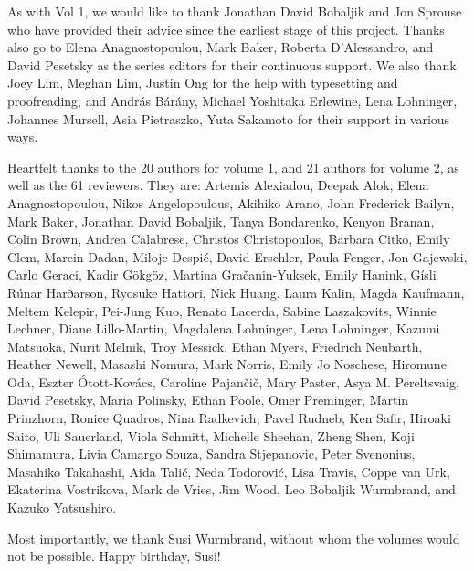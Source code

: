 \begin{refsection}


As with Vol 1, we would like to thank Jonathan David Bobaljik and Jon Sprouse who have provided their advice since the earliest stage of this project. 
Thanks also go to Elena Anagnostopoulou, Mark Baker, Roberta D'Alessandro, and David Pesetsky as the series editors for their continuous support. 
We also thank Joey Lim, Meghan Lim, Justin Ong for the help with typesetting and proofreading, and András Bárány, Michael Yoshitaka Erlewine, Lena Lohninger, Johannes Mursell, Asia Pietraszko, Yuta Sakamoto for their support in various ways.

Heartfelt thanks to the 20 authors for volume 1, and 21 authors for volume 2, as well as the 61 reviewers. They are: 
Artemis Alexiadou, 
Deepak Alok, 
Elena Anagnostopoulou, 
Nikos Angelopoulous, 
Akihiko Arano, 
John Frederick Bailyn, 
Mark Baker, 
Jonathan David Bobaljik, 
Tanya Bondarenko, 
Kenyon Branan, 
Colin Brown, 
Andrea Calabrese, 
Christos Christopoulos, 
Barbara Citko, 
Emily Clem, 
Marcin Dadan, 
Miloje Despić, 
David Erschler, 
Paula Fenger, 
Jon Gajewski, 
Carlo Geraci, 
Kadir Gökgöz, 
Martina Gračanin-Yuksek, 
Emily Hanink, 
Gísli Rúnar Harðarson, 
Ryosuke Hattori, 
Nick Huang, 
Laura Kalin, 
Magda Kaufmann, 
Meltem Kelepir, 
Pei-Jung Kuo, 
Renato Lacerda, 
Sabine Laszakovits, 
Winnie Lechner, 
Diane Lillo-Martin, 
Magdalena Lohninger, 
Lena Lohninger, 
Kazumi Matsuoka, 
Nurit Melnik, 
Troy Messick, 
Ethan Myers, 
Friedrich Neubarth, 
Heather Newell, 
Masashi Nomura, 
Mark Norris, 
Emily Jo Noschese, 
Hiromune Oda, 
Eszter Ótott-Kovács, 
Caroline Pajančič, 
Mary Paster, 
Asya M. Pereltsvaig, 
David Pesetsky, 
Maria Polinsky, 
Ethan Poole, 
Omer Preminger, 
Martin Prinzhorn, 
Ronice Quadros, 
Nina Radkevich, 
Pavel Rudneb, 
Ken Safir, 
Hiroaki Saito, 
Uli Sauerland, 
Viola Schmitt, 
Michelle Sheehan, 
Zheng Shen, 
Koji Shimamura, 
Livia Camargo Souza, 
Sandra Stjepanovic, 
Peter Svenonius, 
Masahiko Takahashi, 
Aida Talić, 
Neda Todorović, 
Lisa Travis, 
Coppe van Urk, 
Ekaterina Vostrikova, 
Mark de Vries, 
Jim Wood, 
Leo Bobaljik Wurmbrand, and 
Kazuko Yatsushiro.


Most importantly, we thank Susi Wurmbrand, without whom the volumes would not be possible. Happy birthday, Susi!

\begin{comment}
Jonathan Bobaljik
Jon Sprouse
Zheng's students who did typesetting

Reviewers (by name?)

Lena Lohninger: for providing the email of Valentin Panzirsch
Elena Anagnostopoulou: for providing the email address of Athanasios
Yuta Sakamoto: for finding email addresses
\end{comment}

\printbibliography[heading=subbibliography]
\end{refsection}

